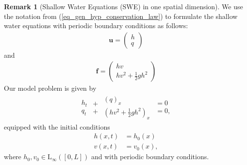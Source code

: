 \documentclass[12pt,a4paper]{article}
\numberwithin{equation}{section}
\theoremstyle{definition}
\newcommand{\vect}[1]{\textbf{#1}}
\newcommand{\leb}{\text{L}}
\newcommand{\qp}[1]{\left(#1\right)}
\newcommand{\qb}[1]{\left[#1\right]}
\newtheorem{Rem}[subsection]{Remark}
\begin{document}
\begin{Rem}[Shallow Water Equations (SWE) in one spatial dimension] We use the notation from (\ref{eq_gen_hyp_conservation_law}) to formulate the shallow water equations with periodic boundary conditions as follows:
	\begin{equation}
	\begin{aligned}
	\vect{u}=\qp{\begin{array}{c}
h\\
q
		\end{array}}
	\end{aligned}
	\end{equation}
	and 
	\begin{equation}
\begin{aligned}
\vect{f}=\qp{\begin{array}{c}
	hv\\
	hv^2+\frac{1}{2}gh^2
	\end{array}}
\end{aligned}
	\end{equation}
		 Our model problem is given by
\begin{equation}\label{eq_model_SWE}
\begin{aligned}
\begin{array}{c}
h_t\\
q_t
\end{array}
\begin{array}{c}
+\\
+
\end{array}
\begin{array}{c}
\qp{q}_x\\
\qp{hv^2+\frac{1}{2}gh^2}_x
\end{array}
\begin{array}{c}
=0\\
=0,
\end{array}
\end{aligned}
\end{equation}
equipped with the initial conditions
\begin{equation}
\begin{aligned}
h\qp{x,t}&=h_0\qp{x}\\
v\qp{x,t}&=v_0\qp{x},
\end{aligned}
\end{equation}
where $h_0, v_0\in \leb_\infty\qp{\qb{0,L}}$ and with periodic boundary conditions.
\end{Rem}
\end{document}
